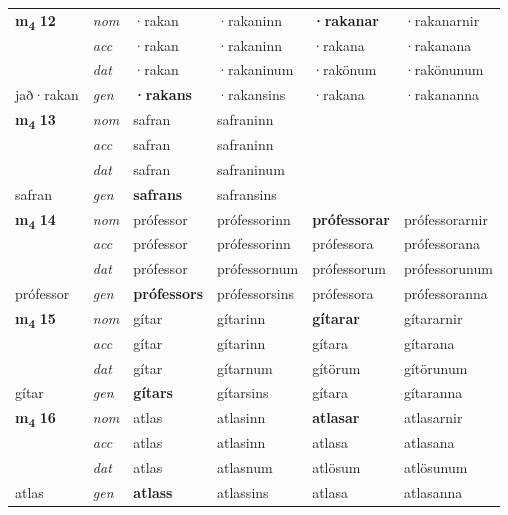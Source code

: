 \begin{longtable}[l]{X>{\footnotesize\itshape}XXXXX}
\multirow{3}{*}{{{\textbf{m{\textsubscript{4}}} \Large{\textbf{12}}}}} & nom & ·rakan & ·rakaninn & \textbf{·rakanar} & ·rakanarnir \\*
 & acc & ·rakan & ·rakaninn & ·rakana & ·rakanana \\*
 & dat & ·rakan & ·rakaninum & ·rakönum & ·rakönunum \\*
 {\footnotesize{jað\allowbreak ·rakan}} & gen & \textbf{·rakans} & ·rakansins & ·rakana & ·rakananna \\
\cmidrule{1-6}

\multirow{3}{*}{{{\textbf{m{\textsubscript{4}}} \Large{\textbf{13}}}}} & nom & safran & safraninn & \textbf{} &  \\*
 & acc & safran & safraninn &  &  \\*
 & dat & safran & safraninum &  &  \\*
 {\footnotesize{safran}} & gen & \textbf{safrans} & safransins &  &  \\
\cmidrule{1-6}

\multirow{3}{*}{{{\textbf{m{\textsubscript{4}}} \Large{\textbf{14}}}}} & nom & prófessor & prófessorinn & \textbf{prófessorar} & prófessorarnir \\*
 & acc & prófessor & prófessorinn & prófessora & prófessorana \\*
 & dat & prófessor & prófessornum & prófessorum & prófessorunum \\*
 {\footnotesize{prófessor}} & gen & \textbf{prófessors} & prófessorsins & prófessora & prófessoranna \\
\cmidrule{1-6}

\multirow{3}{*}{{{\textbf{m{\textsubscript{4}}} \Large{\textbf{15}}}}} & nom & gítar & gítarinn & \textbf{gítarar} & gítararnir \\*
 & acc & gítar & gítarinn & gítara & gítarana \\*
 & dat & gítar & gítarnum & gítörum & gítörunum \\*
 {\footnotesize{gítar}} & gen & \textbf{gítars} & gítarsins & gítara & gítaranna \\
\cmidrule{1-6}

\multirow{3}{*}{{{\textbf{m{\textsubscript{4}}} \Large{\textbf{16}}}}} & nom & atlas & atlasinn & \textbf{atlasar} & atlasarnir \\*
 & acc & atlas & atlasinn & atlasa & atlasana \\*
 & dat & atlas & atlasnum & atlösum & atlösunum \\*
 {\footnotesize{atlas}} & gen & \textbf{atlass} & atlassins & atlasa & atlasanna \\
\cmidrule{1-6}


\end{longtable}
